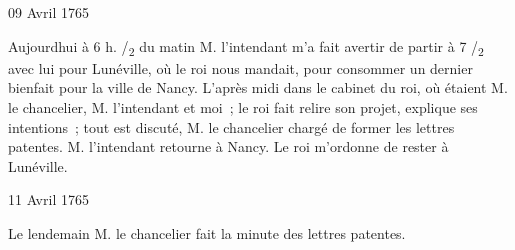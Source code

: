                      \begin{diary}{09 Avril 1765}{}
                        
                         Aujourdhui à 6 h. /\textsubscript{2} du matin M. l'intendant
                           m'a fait avertir de partir à 7 /\textsubscript{2} avec lui
                           pour Lunéville, où le roi nous mandait, pour
                           consommer un dernier bienfait pour la ville
                           de Nancy. L'après midi dans le
                           cabinet
                           du roi, où étaient M. le
                              chancelier, M.
                              l'intendant et moi ; le roi fait relire son projet, explique ses
                           intentions ; tout est
                           discuté, M. le chancelier
                           chargé de former
                           les lettres patentes. M. l'intendant retourne
                           à Nancy. Le roi m'ordonne de rester à Lunéville. \bigskip
        
        
                     \end{diary}

                     \begin{diary}{11 Avril 1765}{}
                        
                         Le lendemain M. le chancelier fait la minute
                           des lettres patentes. \bigskip
        
        
                     \end{diary}

